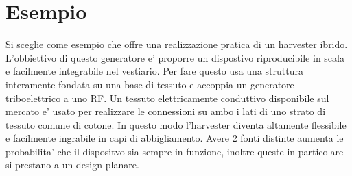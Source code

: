 \chapter{Esempio}
    Si sceglie come esempio \cite{kouWearableAllFabricHybrid2024} che offre una realizzazione pratica di un harvester ibrido. L'obbiettivo di questo generatore e' proporre un dispostivo riproducibile in scala e facilmente integrabile nel vestiario. Per fare questo usa una struttura interamente fondata su una base di tessuto e accoppia un generatore triboelettrico a uno RF. Un tessuto elettricamente conduttivo disponibile sul mercato e' usato per realizzare le connessioni su ambo i lati di uno strato di tessuto comune di cotone. In questo modo l'harvester diventa altamente flessibile e facilmente ingrabile in capi di abbigliamento. Avere 2 fonti distinte aumenta le probabilita' che il dispositvo sia sempre in funzione, inoltre queste in particolare si prestano a un design planare.

